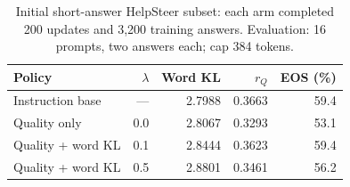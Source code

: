 \begin{table}[htbp]
\centering\small
\caption{Initial short-answer HelpSteer subset: each arm completed 200 updates and 3,200 training answers. Evaluation: 16 prompts, two answers each; cap 384 tokens.}\label{tab:subset-new}
\begin{tabular}{@{}lrrrr@{}}
\toprule
Policy & $\lambda$ & Word KL & $r_Q$ & EOS (\%)\\
\midrule
Instruction base & --- & 2.7988 & 0.3663 & 59.4\\
Quality only & 0.0 & 2.8067 & 0.3293 & 53.1\\
Quality + word KL & 0.1 & 2.8444 & 0.3623 & 59.4\\
Quality + word KL & 0.5 & 2.8801 & 0.3461 & 56.2\\
\bottomrule
\end{tabular}
\end{table}
